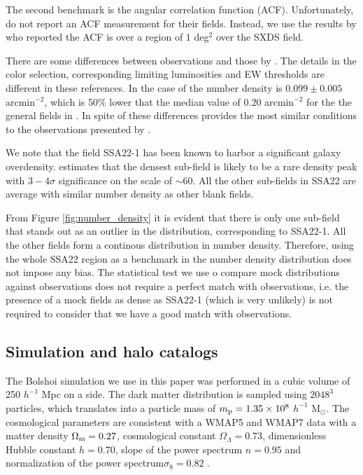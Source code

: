 \documentclass{emulateapj}
\newcommand{\hMpc}{{\ifmmode{h^{-1}{\rm Mpc}}\else{$h^{-1}$Mpc }\fi}}
\begin{document}
The second benchmark is the angular correlation function
(ACF). Unfortunately, \cite{Yamada2012} do  not report an ACF measurement for
their fields. Instead, we use the results by   \cite{Ouchi2008} who
reported the ACF is over a region of $1$ deg$^2$ over the SXDS
field.  

There are some differences between \cite{Ouchi2008} observations
and those by \cite{Yamada2012}. The details in the color selection,
corresponding limiting luminosities and EW thresholds are different
in these references. In the case of
\cite{Ouchi2008} the number density is $0.099\pm0.005$ arcmin$^{-2}$, which
is 50\% lower that the median value of $0.20$ arcmin$^{-2}$ for the
the general fields in \cite{Yamada2012}. In spite of these
differences \cite{Ouchi2008} provides the most similar conditions
to the observations presented by \cite{Yamada2012}.


We note that the field SSA22-1 has been known to harbor a significant
galaxy overdensity. \cite{Yamada2012} estimates that the densest
sub-field is likely to be a rare density peak with $3-4\sigma$
significance on the scale of $\sim 60$\hMpc.  All the other sub-fields
in SSA22 are average with similar number density as other blank fields. 

From Figure \ref{fig:number_density}  it is evident that there is only
one sub-field  that stands out as an outlier in the distribution,
corresponding to SSA22-1. All the other fields form a continous
distribution in number density. Therefore, using the whole SSA22
region as a benchmark in the number density distribution does not
impose any bias. The statistical test we use o compare mock
distributions against observations does not require a perfect match
with observations, i.e. the presence of a mock fields as dense as
SSA22-1 (which is very unlikely) is not required to consider that we
have a good match with observations.

\subsection{Simulation and halo catalogs}

The Bolshoi simulation \citep{Bolshoi} we use in this paper was
performed in a cubic volume of 250 $h^{-1}$ Mpc on a side. The
dark matter distribution is sampled using $2048^{3}$ particles, which
translates into a particle mass of $m_{\rm p}=1.35\times 10^{8}$
$h^{-1}$ M$_{\odot}$.  The cosmological parameters are consistent with
a WMAP5 and WMAP7 data with a matter density $\Omega_{\rm m} = 0.27$,
cosmological constant $\Omega_{\Lambda}=0.73$, dimensionless Hubble constant
$h=0.70$, slope of the power spectrum $n=0.95$ and normalization of the
power spectrum$\sigma_{8}=0.82$ \citep{Komatsu2009,Jarosik2011}.  
\end{document}
